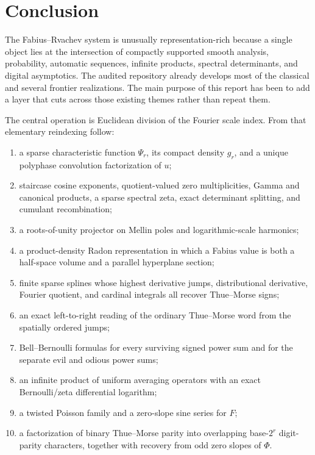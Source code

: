 \documentclass[11pt,oneside]{article}
\numberwithin{equation}{section}
\theoremstyle{definition}
\theoremstyle{remark}
\begin{document}
\section{Conclusion}
\label{sec:conclusion}

The Fabius--Rvachev system is unusually representation-rich because a single
object lies at the intersection of compactly supported smooth analysis,
probability, automatic sequences, infinite products, spectral determinants,
and digital asymptotics.  The audited repository already develops most of the
classical and several frontier realizations.  The main purpose of this report
has been to add a layer that cuts across those existing themes rather than
repeat them.

The central operation is Euclidean division of the Fourier scale index.  From
that elementary reindexing follow:
\begin{enumerate}
\item a sparse characteristic function $\Psi_r$, its compact density $g_r$,
      and a unique polyphase convolution factorization of $u$;
\item staircase cosine exponents, quotient-valued zero multiplicities,
      Gamma and canonical products, a sparse spectral zeta, exact determinant
      splitting, and cumulant recombination;
\item a roots-of-unity projector on Mellin poles and logarithmic-scale
      harmonics;
\item a product-density Radon representation in which a Fabius value is both a
      half-space volume and a parallel hyperplane section;
\item finite sparse splines whose highest derivative jumps, distributional
      derivative, Fourier quotient, and cardinal integrals all recover
      Thue--Morse signs;
\item an exact left-to-right reading of the ordinary Thue--Morse word from the
      spatially ordered jumps;
\item Bell--Bernoulli formulas for every surviving signed power sum and for the
      separate evil and odious power sums;
\item an infinite product of uniform averaging operators with an exact
      Bernoulli/zeta differential logarithm;
\item a twisted Poisson family and a zero-slope sine series for $F$;
\item a factorization of binary Thue--Morse parity into overlapping
      base-$2^r$ digit-parity characters, together with recovery from odd zero
      slopes of $\Phi$.
\end{enumerate}
\end{document}
